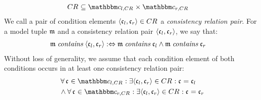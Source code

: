 \begin{definition}
    \begin{align*}
        & 
        \consistencyrelation{CR}{} \subseteq \condition{c}{l,\consistencyrelation{CR}{}} \times \condition{c}{r,\consistencyrelation{CR}{}}
    \end{align*}
    We call a pair of condition elements %
    $\tupled{\conditionelement{c}{l}, \conditionelement{c}{r}} \in \consistencyrelation{CR}{}$ a \emph{consistency relation pair}. 
    For a model tuple $\modeltuple{m}$ and a consistency relation pair $\tupled{\conditionelement{c}{l}, \conditionelement{c}{r}}$, we say that:
    \begin{align*}
        & 
        \modeltuple{m} \containsmath \tupled{\conditionelement{c}{l}, \conditionelement{c}{r}} \equivalentperdefinition \modeltuple{m} \containsmath \conditionelement{c}{l} \land \modeltuple{m} \containsmath \conditionelement{c}{r}
    \end{align*}
    Without loss of generality, we assume that each condition element of both conditions occurs in at least one consistency relation pair:
    \begin{align*}
        & 
        \forall \conditionelement{c}{} \in \condition{c}{l,\consistencyrelation{CR}{}} : \exists \tupled{\conditionelement{c}{l}, \conditionelement{c}{r}} \in \consistencyrelation{CR}{} : \conditionelement{c}{} = \conditionelement{c}{l} \\
        &  
        \land \forall \conditionelement{c}{} \in \condition{c}{r,\consistencyrelation{CR}{}} : \exists \tupled{\conditionelement{c}{l}, \conditionelement{c}{r}} \in \consistencyrelation{CR}{} : \conditionelement{c}{} = \conditionelement{c}{r}
    \end{align*}
\end{definition}

